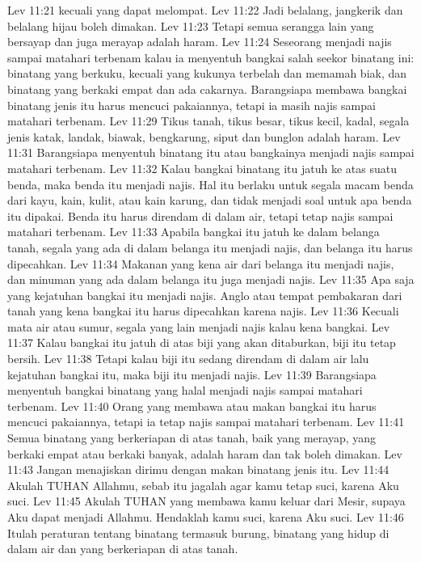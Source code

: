 Lev 11:21  kecuali yang dapat melompat.
Lev 11:22  Jadi belalang, jangkerik dan belalang hijau boleh dimakan.
Lev 11:23  Tetapi semua serangga lain yang bersayap dan juga merayap adalah haram.
Lev 11:24  Seseorang menjadi najis sampai matahari terbenam kalau ia menyentuh bangkai salah seekor binatang ini: binatang yang berkuku, kecuali yang kukunya terbelah dan memamah biak, dan binatang yang berkaki empat dan ada cakarnya. Barangsiapa membawa bangkai binatang jenis itu harus mencuci pakaiannya, tetapi ia masih najis sampai matahari terbenam.
Lev 11:29  Tikus tanah, tikus besar, tikus kecil, kadal, segala jenis katak, landak, biawak, bengkarung, siput dan bunglon adalah haram.
Lev 11:31  Barangsiapa menyentuh binatang itu atau bangkainya menjadi najis sampai matahari terbenam.
Lev 11:32  Kalau bangkai binatang itu jatuh ke atas suatu benda, maka benda itu menjadi najis. Hal itu berlaku untuk segala macam benda dari kayu, kain, kulit, atau kain karung, dan tidak menjadi soal untuk apa benda itu dipakai. Benda itu harus direndam di dalam air, tetapi tetap najis sampai matahari terbenam.
Lev 11:33  Apabila bangkai itu jatuh ke dalam belanga tanah, segala yang ada di dalam belanga itu menjadi najis, dan belanga itu harus dipecahkan.
Lev 11:34  Makanan yang kena air dari belanga itu menjadi najis, dan minuman yang ada dalam belanga itu juga menjadi najis.
Lev 11:35  Apa saja yang kejatuhan bangkai itu menjadi najis. Anglo atau tempat pembakaran dari tanah yang kena bangkai itu harus dipecahkan karena najis.
Lev 11:36  Kecuali mata air atau sumur, segala yang lain menjadi najis kalau kena bangkai.
Lev 11:37  Kalau bangkai itu jatuh di atas biji yang akan ditaburkan, biji itu tetap bersih.
Lev 11:38  Tetapi kalau biji itu sedang direndam di dalam air lalu kejatuhan bangkai itu, maka biji itu menjadi najis.
Lev 11:39  Barangsiapa menyentuh bangkai binatang yang halal menjadi najis sampai matahari terbenam.
Lev 11:40  Orang yang membawa atau makan bangkai itu harus mencuci pakaiannya, tetapi ia tetap najis sampai matahari terbenam.
Lev 11:41  Semua binatang yang berkeriapan di atas tanah, baik yang merayap, yang berkaki empat atau berkaki banyak, adalah haram dan tak boleh dimakan.
Lev 11:43  Jangan menajiskan dirimu dengan makan binatang jenis itu.
Lev 11:44  Akulah TUHAN Allahmu, sebab itu jagalah agar kamu tetap suci, karena Aku suci.
Lev 11:45  Akulah TUHAN yang membawa kamu keluar dari Mesir, supaya Aku dapat menjadi Allahmu. Hendaklah kamu suci, karena Aku suci.
Lev 11:46  Itulah peraturan tentang binatang termasuk burung, binatang yang hidup di dalam air dan yang berkeriapan di atas tanah.
